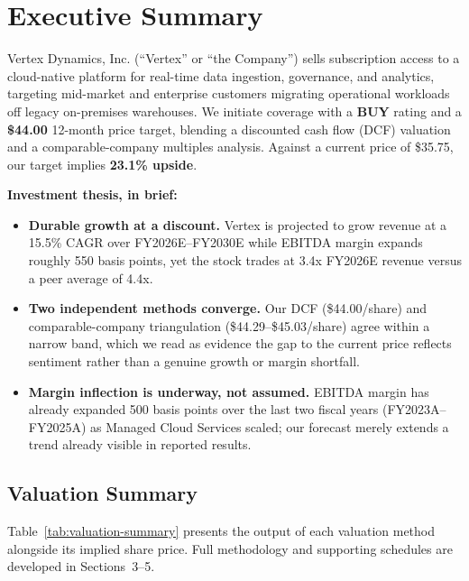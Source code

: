\section{Executive Summary}

Vertex Dynamics, Inc. (``Vertex'' or ``the Company'') sells subscription access to a cloud-native platform for real-time data ingestion, governance, and analytics, targeting mid-market and enterprise customers migrating operational workloads off legacy on-premises warehouses. We initiate coverage with a \textbf{BUY} rating and a \textbf{\$44.00} 12-month price target, blending a discounted cash flow (DCF) valuation and a comparable-company multiples analysis. Against a current price of \$35.75, our target implies \textbf{23.1\% upside}.

\begin{thesisbox}
\textbf{\color{meridiannavy}Investment thesis, in brief:}
\begin{itemize}[leftmargin=1.3em,itemsep=2pt,topsep=2pt]
\item \textbf{Durable growth at a discount.} Vertex is projected to grow revenue at a 15.5\% CAGR over FY2026E--FY2030E while EBITDA margin expands roughly 550 basis points, yet the stock trades at 3.4x FY2026E revenue versus a peer average of 4.4x.
\item \textbf{Two independent methods converge.} Our DCF (\$44.00/share) and comparable-company triangulation (\$44.29--\$45.03/share) agree within a narrow band, which we read as evidence the gap to the current price reflects sentiment rather than a genuine growth or margin shortfall.
\item \textbf{Margin inflection is underway, not assumed.} EBITDA margin has already expanded 500 basis points over the last two fiscal years (FY2023A--FY2025A) as Managed Cloud Services scaled; our forecast merely extends a trend already visible in reported results.
\end{itemize}
\end{thesisbox}

\subsection{Valuation Summary}

Table~\ref{tab:valuation-summary} presents the output of each valuation method alongside its implied share price. Full methodology and supporting schedules are developed in Sections~3--5.

